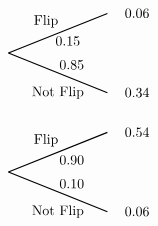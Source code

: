 \documentclass[12pt,letterpaper]{exam}
\begin{document}
\begin{questions}
\[\begin{tikzpicture}[scale= 1.0]
		\node at (3.45,2.3) {\SecondUpLabel};
		\node at (3.75,0.5) {\SecondDownLabel};
		\node at (4,1.8) {\UpUp};
		\node at (4.1,1.2) {\UpDown};
		\node at (5.75,2.5) {\first};
		\node at (5.75,0.5) {\second};
		\draw[thick] (2.5,1.5) -- (5,2.5);
		\draw[thick] (2.5,1.5) -- (5,0.5);

		\node at (3.45,-0.7) {\SecondUpLabel};
		\node at (3.75,-2.5) {\SecondDownLabel};
		\node at (4.1,-1.2) {\DownUp};
		\node at (4.1,-1.8) {\DownDown};
		\node at (5.75,-0.5) {\third};	
		\node at (5.75,-2.5) {\fourth};	
		\draw[thick] (2.5,-1.5) -- (5,-0.5);
		\draw[thick] (2.5,-1.5) -- (5,-2.5);
		\end{tikzpicture}
		\]


\end{questions}
\end{document}

